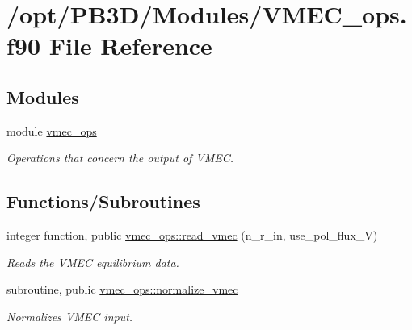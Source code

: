 \hypertarget{VMEC__ops_8f90}{}\section{/opt/\+P\+B3\+D/\+Modules/\+V\+M\+E\+C\+\_\+ops.f90 File Reference}
\label{VMEC__ops_8f90}
\subsection*{Modules}
\begin{DoxyCompactItemize}
\item 
module \hyperlink{namespacevmec__ops}{vmec\+\_\+ops}
\begin{DoxyCompactList}\small\item\em Operations that concern the output of V\+M\+EC. \end{DoxyCompactList}\end{DoxyCompactItemize}
\subsection*{Functions/\+Subroutines}
\begin{DoxyCompactItemize}
\item 
integer function, public \hyperlink{namespacevmec__ops_a5afb9dedf9ef3dc2b4d93e20de2e22b8}{vmec\+\_\+ops\+::read\+\_\+vmec} (n\+\_\+r\+\_\+in, use\+\_\+pol\+\_\+flux\+\_\+V)
\begin{DoxyCompactList}\small\item\em Reads the V\+M\+EC equilibrium data. \end{DoxyCompactList}\item 
subroutine, public \hyperlink{namespacevmec__ops_a95f04a642fd732a538aef30052a12863}{vmec\+\_\+ops\+::normalize\+\_\+vmec}
\begin{DoxyCompactList}\small\item\em Normalizes V\+M\+EC input. \end{DoxyCompactList}\end{DoxyCompactItemize}
